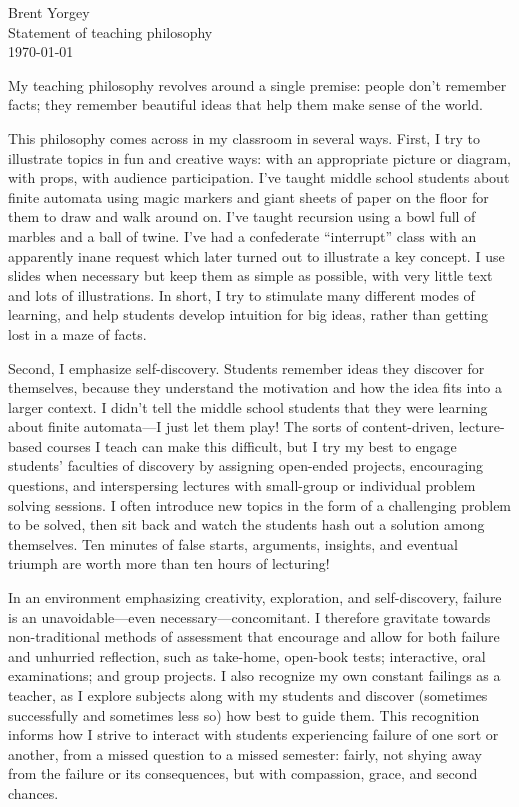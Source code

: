 \documentclass{article}
\begin{document}
\noindent Brent Yorgey \\
Statement of teaching philosophy \\
\today
\bigskip

My teaching philosophy revolves around a single premise: people
don't remember facts; they remember beautiful ideas that help them
make sense of the world.

This philosophy comes across in my classroom in several ways. First, I
try to illustrate topics in fun and creative ways: with an appropriate
picture or diagram, with props, with audience participation.  I've
taught middle school students about finite automata using magic
markers and giant sheets of paper on the floor for them to draw and
walk around on.  I've taught recursion using a bowl full of marbles
and a ball of twine.  I've had a confederate ``interrupt'' class with
an apparently inane request which later turned out to illustrate a key
concept.  I use slides when necessary but keep them as simple as
possible, with very little text and lots of illustrations.  In short,
I try to stimulate many different modes of learning, and help students
develop intuition for big ideas, rather than getting lost in a maze of
facts.

Second, I emphasize self-discovery. Students remember ideas they
discover for themselves, because they understand the motivation and
how the idea fits into a larger context. I didn't tell the middle
school students that they were learning about finite automata---I just
let them play! The sorts of content-driven, lecture-based courses I
teach can make this difficult, but I try my best to engage students'
faculties of discovery by assigning open-ended projects, encouraging
questions, and interspersing lectures with small-group or individual
problem solving sessions.  I often introduce new topics in the form of
a challenging problem to be solved, then sit back and watch the
students hash out a solution among themselves.  Ten minutes of false
starts, arguments, insights, and eventual triumph are worth more than
ten hours of lecturing!

In an environment emphasizing creativity, exploration, and
self-discovery, failure is an unavoidable---even
necessary---concomitant.  I therefore gravitate towards
non-traditional methods of assessment that encourage and allow for
both failure and unhurried reflection, such as take-home, open-book
tests; interactive, oral examinations; and group projects.  I also
recognize my own constant failings as a teacher, as I explore subjects
along with my students and discover (sometimes successfully and
sometimes less so) how best to guide them.  This recognition informs
how I strive to interact with students experiencing failure of one
sort or another, from a missed question to a missed semester: fairly,
not shying away from the failure or its consequences, but with
compassion, grace, and second chances.
\end{document}
